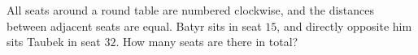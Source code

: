All seats around a round table are numbered clockwise, and the distances between adjacent seats are equal. Batyr sits in seat $15$, and directly opposite him sits Taubek in seat $32$. How many seats are there in total?
